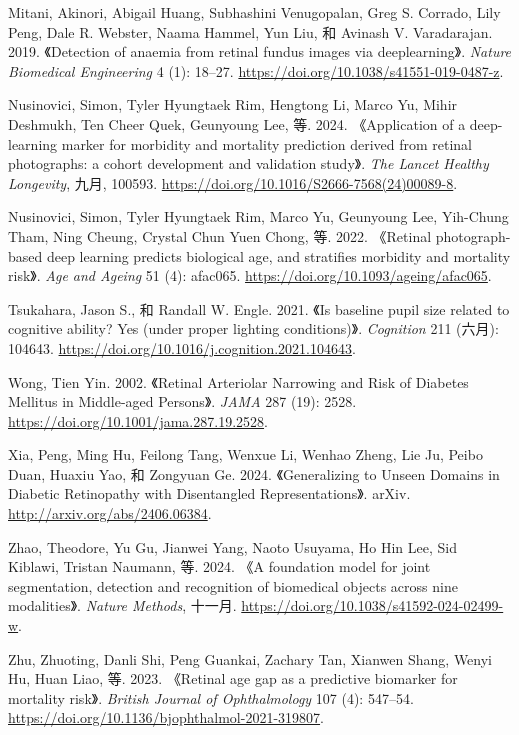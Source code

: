 \documentclass[
  Letterpaper,
]{scrbook}
\newlength{\cslhangindent}
\newenvironment{CSLReferences}[2] %
 {\begin{list}{}{%
  \setlength{\itemindent}{0pt}
  \setlength{\leftmargin}{0pt}
  \setlength{\parsep}{0pt}
  \ifodd #1
   \setlength{\leftmargin}{\cslhangindent}
   \setlength{\itemindent}{-1\cslhangindent}
  \fi
  \setlength{\itemsep}{#2\baselineskip}}}
 {\end{list}}
\begin{document}
\begin{CSLReferences}{1}{0}
Mitani, Akinori, Abigail Huang, Subhashini Venugopalan, Greg S. Corrado,
Lily Peng, Dale R. Webster, Naama Hammel, Yun Liu, 和 Avinash V.
Varadarajan. 2019. {《Detection of anaemia from retinal fundus images
via deeplearning》}. \emph{Nature Biomedical Engineering} 4 (1): 18--27.
\url{https://doi.org/10.1038/s41551-019-0487-z}.

Nusinovici, Simon, Tyler Hyungtaek Rim, Hengtong Li, Marco Yu, Mihir
Deshmukh, Ten Cheer Quek, Geunyoung Lee, 等. 2024. {《Application of a
deep-learning marker for morbidity and mortality prediction derived from
retinal photographs: a cohort development and validation study》}.
\emph{The Lancet Healthy Longevity}, 九月, 100593.
\url{https://doi.org/10.1016/S2666-7568(24)00089-8}.

Nusinovici, Simon, Tyler Hyungtaek Rim, Marco Yu, Geunyoung Lee,
Yih-Chung Tham, Ning Cheung, Crystal Chun Yuen Chong, 等. 2022.
{《Retinal photograph-based deep learning predicts biological age, and
stratifies morbidity and mortality risk》}. \emph{Age and Ageing} 51
(4): afac065. \url{https://doi.org/10.1093/ageing/afac065}.

Tsukahara, Jason S., 和 Randall W. Engle. 2021. {《Is baseline pupil
size related to cognitive ability? {Yes} (under proper lighting
conditions)》}. \emph{Cognition} 211 (六月): 104643.
\url{https://doi.org/10.1016/j.cognition.2021.104643}.

Wong, Tien Yin. 2002. {《Retinal {Arteriolar} {Narrowing} and {Risk} of
{Diabetes} {Mellitus} in {Middle}-aged {Persons}》}. \emph{JAMA} 287
(19): 2528. \url{https://doi.org/10.1001/jama.287.19.2528}.

Xia, Peng, Ming Hu, Feilong Tang, Wenxue Li, Wenhao Zheng, Lie Ju, Peibo
Duan, Huaxiu Yao, 和 Zongyuan Ge. 2024. {《Generalizing to {Unseen}
{Domains} in {Diabetic} {Retinopathy} with {Disentangled}
{Representations}》}. arXiv. \url{http://arxiv.org/abs/2406.06384}.

Zhao, Theodore, Yu Gu, Jianwei Yang, Naoto Usuyama, Ho Hin Lee, Sid
Kiblawi, Tristan Naumann, 等. 2024. {《A foundation model for joint
segmentation, detection and recognition of biomedical objects across
nine modalities》}. \emph{Nature Methods}, 十一月.
\url{https://doi.org/10.1038/s41592-024-02499-w}.

Zhu, Zhuoting, Danli Shi, Peng Guankai, Zachary Tan, Xianwen Shang,
Wenyi Hu, Huan Liao, 等. 2023. {《Retinal age gap as a predictive
biomarker for mortality risk》}. \emph{British Journal of Ophthalmology}
107 (4): 547--54.
\url{https://doi.org/10.1136/bjophthalmol-2021-319807}.

\end{CSLReferences}


\backmatter
\end{document}
